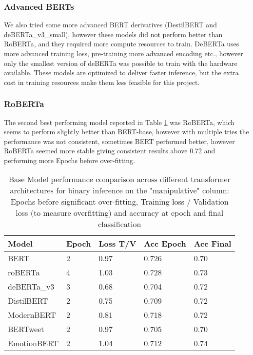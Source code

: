 \documentclass[
	letterpaper, %
	12pt, %
	unnumberedsections, %
	twoside, %
]{LTJournalArticle}
\begin{document}
\subsubsection{Advanced BERTs}
We also tried some more advanced BERT derivatives (DestilBERT and deBERTa\_v3\_small), however these models did not perform better than RoBERTa, and they required more compute resources to train. DeBERTa uses more advanced training loss, pre-training more advanced encoding etc.\cite{DeBERTaV3}, however only the smallest version of deBERTa was possible to train with the hardware available. These models are optimized to deliver faster inference, but the extra cost in training resources make them less feasible for this project.
\subsubsection{RoBERTa}
The second best performing model reported in Table \ref{tab:BaseModelPerformance} was RoBERTa, which seems to perform slightly better than BERT-base, however with multiple tries the performance was not consistent, sometimes BERT performed better, however RoBERTa seemed more stable giving consistent results above 0.72 and performing more Epochs before over-fitting.


\begin{table}[h!]
	\small
	\begin{tabular}{|p{2.2cm}|p{0.9cm}|p{1cm}|p{1cm}|p{1cm}|}
		\hline
		\textbf{Model} & \textbf{Epoch} & \textbf{Loss T/V} & \textbf{Acc Epoch} & \textbf{Acc Final} \\
		\hline
		BERT           & 2              & 0.97              & 0.726              & 0.70               \\
		roBERTa        & 4              & 1.03              & 0.728              & 0.73               \\
		deBERTa\_v3    & 3              & 0.68              & 0.704              & 0.72               \\
		DistilBERT     & 2              & 0.75              & 0.709              & 0.72               \\
		ModernBERT     & 2              & 0.81              & 0.718              & 0.72               \\
		BERTweet       & 2              & 0.97              & 0.705              & 0.70               \\
		EmotionBERT    & 2              & 1.04              & 0.712              & 0.74               \\


		\hline
	\end{tabular}
	\caption{Base Model performance comparison across different transformer architectures for binary inference on the "manipulative" column: Epochs before significant over-fitting, Training loss / Validation loss (to measure  overfitting) and accuracy at epoch and final classification }
	\label{tab:BaseModelPerformance}
\end{table}
\end{document}
